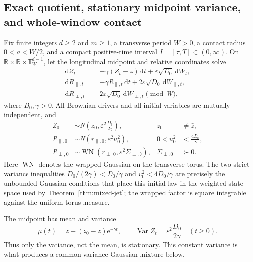 \documentclass[aps,physrev,onecolumn,amsmath,amssymb,longbibliography]{revtex4-2}
\newcommand{\dd}{\mathrm d}
\newcommand{\e}{\mathrm e}
\begin{document}
\subsection{Exact quotient, stationary midpoint variance, and whole-window
contact}
\label{subsec:exactmfull-physical}

Fix finite integers \(d\ge2\) and \(m\ge1\), a transverse period \(W>0\), a
contact radius \(0<a<W/2\), and a compact positive-time interval
\(I=[\tau,T]\subset(0,\infty)\).  On
\(\mathbb R\times\mathbb R\times\mathbb T_W^{d-1}\), let the longitudinal
midpoint and relative coordinates solve
\begin{align}
 \dd Z_t&=-\gamma(Z_t-\bar z)\,\dd t
       +\varepsilon\sqrt{D_0}\,\dd W_t,
 \label{eq:exactmfull-midpoint-sde}\\
 \dd R_{\parallel,t}&=-\gamma R_{\parallel,t}\,\dd t
       +2\varepsilon\sqrt{D_0}\,\dd W_{\parallel,t},
 \label{eq:exactmfull-relative-long-sde}\\
 \dd R_{\perp,t}&=2\varepsilon\sqrt{D_0}\,\dd W_{\perp,t}
       \pmod W,
 \label{eq:exactmfull-relative-perp-sde}
\end{align}
where \(D_0,\gamma>0\).  All Brownian drivers and all initial variables are
mutually independent, and
\begin{align}
 Z_0&\sim N\!\left(z_0,\varepsilon^2\frac{D_0}{2\gamma}\right),
 &z_0&\ne\bar z,
 \label{eq:exactmfull-midpoint-initial}\\
 R_{\parallel,0}&\sim
 N(r_{\parallel,0},\varepsilon^2u_0^2),
 &0<u_0^2&<\frac{4D_0}{\gamma},
 \label{eq:exactmfull-relative-long-initial}\\
 R_{\perp,0}&\sim
 \operatorname{WN}(r_{\perp,0},\varepsilon^2\Sigma_{\perp,0}),
 &\Sigma_{\perp,0}&\succ0.
 \label{eq:exactmfull-relative-perp-initial}
\end{align}
Here \(\operatorname{WN}\) denotes the wrapped Gaussian on the transverse
torus.  The two strict variance inequalities
\(D_0/(2\gamma)<D_0/\gamma\) and
\(u_0^2<4D_0/\gamma\) are precisely the unbounded Gaussian conditions that
place this initial law in the weighted state space used by
Theorem~\ref{thm:mixed-jet}; the wrapped factor is square integrable against
the uniform torus measure.

The midpoint has mean and variance
\begin{equation}
 \mu(t)=\bar z+(z_0-\bar z)\e^{-\gamma t},
 \qquad
 \operatorname{Var}Z_t=\varepsilon^2\frac{D_0}{2\gamma}
 \quad(t\ge0).
 \label{eq:exactmfull-stationary-variance}
\end{equation}
Thus only the variance, not the mean, is stationary.  This constant variance
is what produces a common-variance Gaussian mixture below.
\end{document}
